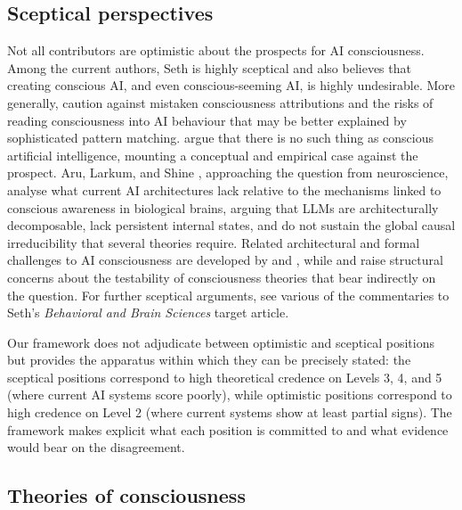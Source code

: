 \documentclass[11pt, a4paper, onecolumn, gdm]{google}
\begin{document}
\subsection{Sceptical perspectives}\label{sceptical-perspectives}

Not all contributors are optimistic about the prospects for AI consciousness. 
Among the current authors, Seth is highly sceptical \citep[see][]{seth2024,seth2026stuff} and also believes that creating conscious AI, and even conscious-seeming AI, is highly undesirable. More generally,
\citet{bengio2025} caution against mistaken consciousness attributions and the risks of reading consciousness into AI behaviour that may be better explained by sophisticated pattern matching.
\citet{porebski2025} argue that there is no such thing as conscious artificial intelligence, mounting a conceptual and empirical case against the prospect.
Aru, Larkum, and Shine \citeyearpar{aru2023}, approaching the question from neuroscience, analyse what current AI architectures lack relative to the mechanisms linked to conscious awareness in biological brains, arguing that LLMs are architecturally decomposable, lack persistent internal states, and do not sustain the global causal irreducibility that several theories require.
Related architectural and formal challenges to AI consciousness are developed by \citet{hoel2026} and \citet{bennett2026}, while \citet{kleinerhoel2021} and \citet{kleiner2024} raise structural concerns about the testability of consciousness theories that bear indirectly on the question. 
For further sceptical arguments, see various of the commentaries to Seth's \citeyearpar{seth2024} \emph{Behavioral and Brain Sciences} target article.

Our framework does not adjudicate between optimistic and sceptical positions but provides the apparatus within which they can be precisely stated: the sceptical positions correspond to high theoretical credence on Levels 3, 4, and 5 (where current AI systems score poorly), while optimistic positions correspond to high credence on Level 2 (where current systems show at least partial signs).
The framework makes explicit what each position is committed to and what evidence would bear on the disagreement.

\subsection{Theories of consciousness}\label{theories-of-consciousness}
\end{document}

